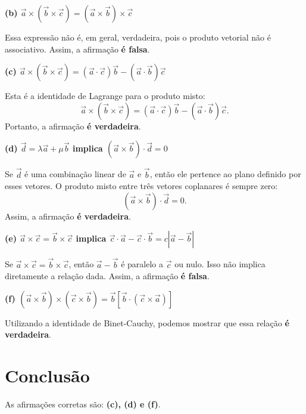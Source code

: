 \documentclass[a4paper,12pt]{article}
\begin{document}
\begin{flushleft}
\textbf{(b) $\vec{a} \times (\vec{b} \times \vec{c}) = (\vec{a} \times \vec{b}) \times \vec{c}$}

Essa expressão não é, em geral, verdadeira, pois o produto vetorial não é associativo. Assim, a afirmação \textbf{é falsa}.

\textbf{(c) $\vec{a} \times (\vec{b} \times \vec{c}) = (\vec{a} \cdot \vec{c}) \vec{b} - (\vec{a} \cdot \vec{b}) \vec{c}$}

Esta é a identidade de Lagrange para o produto misto:
\begin{equation}
    \vec{a} \times (\vec{b} \times \vec{c}) = (\vec{a} \cdot \vec{c})\vec{b} - (\vec{a} \cdot \vec{b})\vec{c}.
\end{equation}
Portanto, a afirmação \textbf{é verdadeira}.

\textbf{(d) $\vec{d} = \lambda \vec{a} + \mu \vec{b}$ implica $(\vec{a} \times \vec{b}) \cdot \vec{d} = 0$}

Se $\vec{d}$ é uma combinação linear de $\vec{a}$ e $\vec{b}$, então ele pertence ao plano definido por esses vetores. O produto misto entre três vetores coplanares é sempre zero:
\begin{equation}
    (\vec{a} \times \vec{b}) \cdot \vec{d} = 0.
\end{equation}
Assim, a afirmação \textbf{é verdadeira}.

\textbf{(e) $\vec{a} \times \vec{c} = \vec{b} \times \vec{c}$ implica $\vec{c} \cdot \vec{a} - \vec{c} \cdot \vec{b} = c|\vec{a} - \vec{b}|$}

Se $\vec{a} \times \vec{c} = \vec{b} \times \vec{c}$, então $\vec{a} - \vec{b}$ é paralelo a $\vec{c}$ ou nulo. Isso não implica diretamente a relação dada. Assim, a afirmação \textbf{é falsa}.

\textbf{(f) $(\vec{a} \times \vec{b}) \times (\vec{c} \times \vec{b}) = \vec{b} [\vec{b} \cdot (\vec{c} \times \vec{a})]$}

Utilizando a identidade de Binet-Cauchy, podemos mostrar que essa relação \textbf{é verdadeira}.

\section*{Conclusão}
As afirmações corretas são: \textbf{(c), (d) e (f)}.

\end{flushleft}
\end{document}

